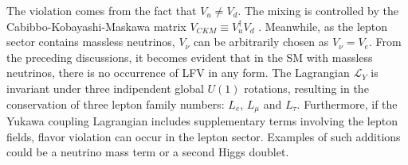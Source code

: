 The violation comes from the fact that $V_u \neq V_d$. The mixing is controlled by the Cabibbo-Kobayashi-Maskawa matrix $V_{CKM}\equiv V^{\dagger}_u V_d $ \cite{PhysRevLett.10.531}. Meanwhile, as the lepton sector contains massless neutrinos, $V_{\nu}$ can be arbitrarily chosen as $V_{\nu}=V_e$. From the preceding discussions, it becomes evident that in the SM with massless neutrinos, there is no occurrence of LFV in any form. The Lagrangian $\mathscr{L}_Y$ is invariant under three indipendent global $U(1)$ rotations, resulting in the conservation of three lepton family numbers: $L_e$, $L_\mu$ and $L_\tau$. Furthermore, if the Yukawa coupling Lagrangian includes supplementary terms involving the lepton fields, flavor violation can occur in the lepton sector. Examples of such additions could be a neutrino mass term or a second Higgs doublet.

